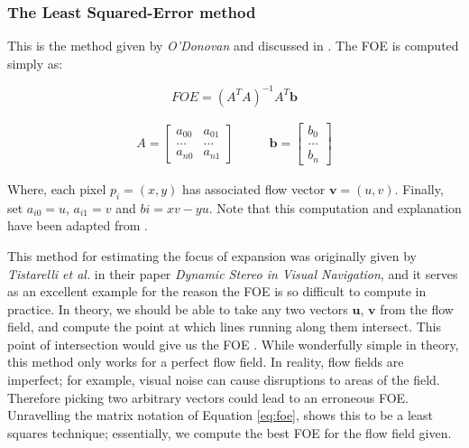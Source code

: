 \documentclass[a4paper,11pt,twoside,openright]{article}
\begin{document}
\subsubsection{The Least Squared-Error method}
This is the method given by \textit{O'Donovan} and discussed in
\cite{Mitchell2018}. The FOE is computed simply as:

\begin{equation}
  \label{eq:foe}
  FOE = (A^TA)^{-1}A^T\mathbf{b}
\end{equation}

\begin{equation*}
  \begin{split}
 A =
\begin{bmatrix}
  a_{00} & a_{01}\\
  \dots  & \dots \\
  a_{n0} &  a_{n1}
\end{bmatrix}
\qquad
\end{split}
\begin{split}
\mathbf{b} =
\begin{bmatrix}
  b_0 \\
  \dots \\
  b_n
\end{bmatrix}
\end{split}
\end{equation*}
\newline

Where, each pixel $p_i = (x, y)$ has associated flow vector $\mathbf{v} = (u,v)$.
Finally, set $a_{i0} = u$, $a_{i1} = v$ and $b{i} = xv - yu$. Note that this
computation and explanation have been adapted from \cite{Mitchell2018}.
\newline
\par

This method for estimating the focus of expansion was originally given
by \textit{Tistarelli et al.} in their paper \textit{Dynamic Stereo in
  Visual Navigation}\cite{Tistarelli1991, ODonovan2005}, and it serves
as an excellent example for the reason the FOE is so difficult to
compute in practice. In theory, we should be able to take any two
vectors $\mathbf{u}$, $\mathbf{v}$ from the flow field, and compute
the point at which lines running along them intersect. This point of
intersection would give us the FOE \cite{ODonovan2005}. While
wonderfully simple in theory, this method only works for a perfect
flow field. In reality, flow fields are imperfect; for example, visual
noise can cause disruptions to areas of the field. Therefore picking
two arbitrary vectors could lead to an erroneous FOE. Unravelling the
matrix notation of Equation \ref{eq:foe}, shows this to be a least
squares technique; essentially, we compute the best FOE for the flow
field given.
\end{document}
